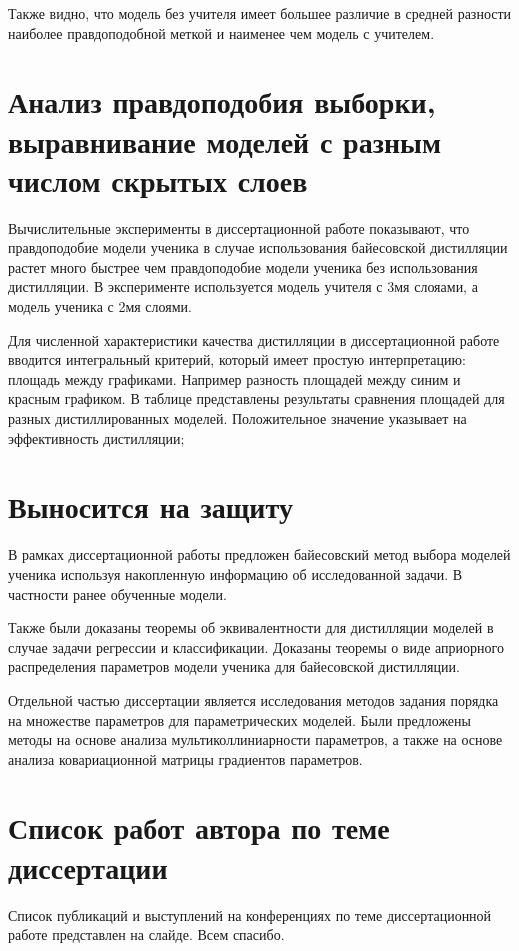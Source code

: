 \documentclass[10pt, twoside]{article}
\begin{document}
Также видно, что модель без учителя имеет большее различие в средней разности наиболее правдоподобной меткой и наименее чем модель с учителем.

\section{Анализ правдоподобия выборки, выравнивание моделей с разным числом скрытых слоев}

Вычислительные эксперименты в диссертационной работе показывают, что правдоподобие модели ученика в случае использования байесовской дистилляции растет много быстрее чем правдоподобие модели ученика без использования дистилляции. В эксперименте используется модель учителя с 3мя слояами, а модель ученика с 2мя слоями.

Для численной характеристики качества дистилляции в диссертационной работе вводится интегральный критерий, который имеет простую интерпретацию: площадь между графиками. Например разность площадей между синим и красным графиком. В таблице представлены результаты сравнения площадей для разных дистиллированных моделей. Положительное значение указывает на эффективность дистилляции;

\section{Выносится на защиту}
В рамках диссертационной работы предложен байесовский метод выбора моделей ученика используя накопленную информацию об исследованной задачи. В частности ранее обученные модели.

Также были доказаны теоремы об эквивалентности для дистилляции моделей в случае задачи регрессии и классификации. Доказаны теоремы о виде априорного распределения параметров модели ученика для байесовской дистилляции.

Отдельной частью диссертации является исследования методов задания порядка на множестве параметров для параметрических моделей. Были предложены методы на основе анализа мультиколлиниарности параметров, а также на основе анализа ковариационной матрицы градиентов параметров.

\section{Список работ автора по теме диссертации}
Список публикаций и выступлений на конференциях по теме диссертационной работе представлен на слайде. Всем спасибо.
\end{document}
